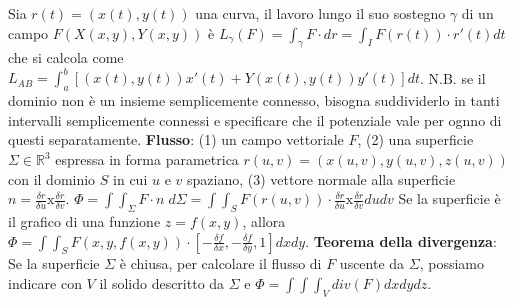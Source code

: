 \documentclass[fontsize=8pt]{scrartcl}
\begin{document}
\begin{multicols*}{4}
Sia $r(t) = (x(t), y(t))$ una curva, il lavoro lungo il suo sostegno $\gamma$ di un campo $F(X(x,y), Y(x,y))$ è \newline
$L_{\gamma}(F) = \int_\gamma F \cdot  dr = \int_{I} F(r(t)) \cdot r'(t) dt$\newline
che si calcola come $L_{AB} = \int_{a}^{b} [ (x(t),y(t))x'(t) + Y(x(t), y(t)) y'(t) ]dt$.\newline
N.B. se il dominio non è un insieme semplicemente connesso, bisogna suddividerlo in tanti intervalli semplicemente connessi e specificare che il potenziale vale per ognno di questi separatamente.\newline
\textbf{Flusso}:\newline
(1) un campo vettoriale $F$, (2) una superficie $\Sigma \in \mathbb{R}^3$ espressa in forma parametrica $r(u,v) = (x(u,v), y(u,v), z(u,v))$ con il dominio $S$ in cui $u$ e $v$ spaziano, (3) vettore normale alla superficie $n = \frac{\delta r}{\delta u}\text{x}\frac{\delta r}{\delta v}$.\newline
$\Phi = \int \int_{\Sigma} F \cdot n \; d\Sigma = \int \int_{S} F(r(u,v)) \cdot \frac{\delta r}{\delta u}\text{x}\frac{\delta r}{\delta v} du dv$\newline
Se la superficie è il grafico di una funzione $z = f(x,y)$, allora $\Phi = \int \int_S F(x,y,f(x,y)) \cdot \left[- \frac{\delta f}{\delta x}, - \frac{\delta f}{\delta y}, 1\right] dx dy$.\newline
\textbf{Teorema della divergenza}:\newline
Se la superficie $\Sigma$ è chiusa, per calcolare il flusso di $F$ uscente da $\Sigma$, possiamo indicare con $V$ il solido descritto da $\Sigma$ e $\Phi = \int \int \int_V div(F) dx dy dz$.

\end{multicols*}
\end{document}
